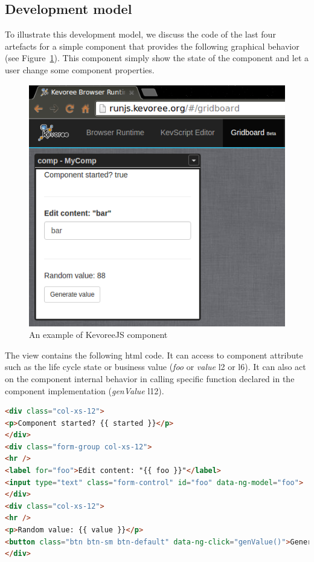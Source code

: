 \subsection{Development model}
To illustrate this development model, we discuss the code of the last four artefacts for a simple component that provides the following graphical behavior (see Figure~\ref{fig:fig5}). This component simply show the state of the component and let a user change some component properties. 


\begin{figure}[h]
	\centering
	\includegraphics[width=0.8\linewidth]{figures/fig5}
	\caption{An example of KevoreeJS component}
	\label{fig:fig5}
\end{figure}

The view contains the following html code. It can access to component attribute such as the life cycle state or business value (\emph{foo} or \emph{value} l2 or l6). It can also act on the component internal behavior in calling specific function declared in the component implementation (\emph{genValue} l12).

\begin{lstlisting}[language=HTML,numbers=right,firstnumber=last]
<div class="col-xs-12">
<p>Component started? {{ started }}</p>
</div>
<div class="form-group col-xs-12">
<hr />
<label for="foo">Edit content: "{{ foo }}"</label>
<input type="text" class="form-control" id="foo" data-ng-model="foo">
</div>
<div class="col-xs-12">
<hr />
<p>Random value: {{ value }}</p>
<button class="btn btn-sm btn-default" data-ng-click="genValue()">Generate value</button>
</div>
\end{lstlisting}


